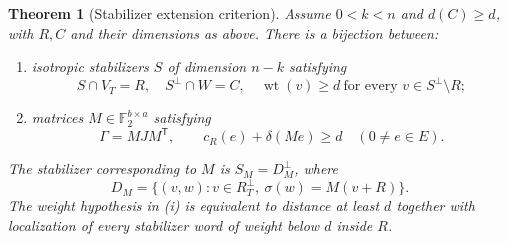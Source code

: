 \documentclass[11pt]{article}
\newtheorem{theorem}{Theorem}[section]
\theoremstyle{definition}
\theoremstyle{remark}
\newcommand{\F}{\mathbb F_2}
\newcommand{\wt}{\operatorname{wt}}
\newcommand{\cost}{c_R}
\newcommand{\tr}{\mathsf T}
\begin{document}
\begin{theorem}[Stabilizer extension criterion]\label{thm:extension}
Assume \(0<k<n\) and \(d(C)\geq d\), with \(R,C\) and their dimensions
as above.
There is a bijection between:
\begin{enumerate}[label=(\roman*)]
\item isotropic stabilizers \(S\) of dimension \(n-k\) satisfying
\[
 S\cap V_T=R,\quad S^\perp\cap W=C,\quad
 \wt(v)\geq d\ \text{for every }v\in S^\perp\setminus R;
\]
\item matrices \(M\in\F^{b\times a}\) satisfying
\begin{equation}\label{eq:exact}
 \Gamma=MJM^\tr,\qquad
 \cost(e)+\delta(Me)\geq d\quad(0\ne e\in E).
\end{equation}
\end{enumerate}
The stabilizer corresponding to \(M\) is \(S_M=D_M^\perp\), where
\begin{equation}\label{eq:graph-D}
 D_M=\{(v,w):v\in R_T^\perp,\ \sigma(w)=M(v+R)\}.
\end{equation}
The weight hypothesis in (i) is equivalent to distance at least \(d\)
together with localization of every stabilizer word of weight below \(d\)
inside \(R\).
\end{theorem}
\end{document}
